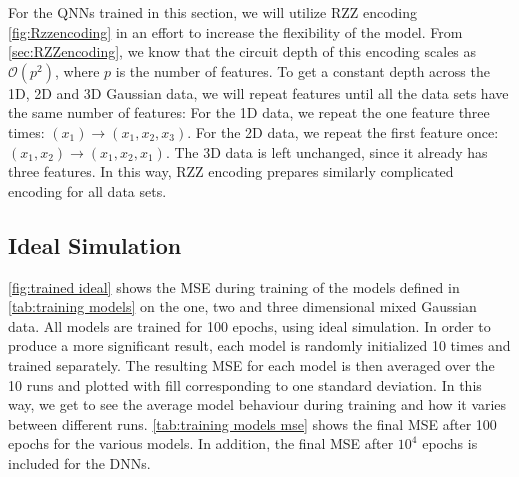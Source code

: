 For the QNNs trained in this section, we will utilize RZZ encoding \autoref{fig:Rzzencoding} in an effort to increase the flexibility of the model. From \autoref{sec:RZZencoding}, we know that the circuit depth of this encoding scales as $\mathcal{O}(p^2)$, where $p$ is the number of features. To get a constant depth across the 1D, 2D and 3D Gaussian data, we will repeat features until all the data sets have the same number of features: For the 1D data, we repeat the one feature three times: $(x_1) \rightarrow (x_1, x_2, x_3)$. For the 2D data, we repeat the first feature once: $(x_1, x_2) \rightarrow (x_1, x_2, x_1)$. The 3D data is left unchanged, since it already has three features. In this way, RZZ encoding prepares similarly complicated encoding for all data sets. 


\subsection{Ideal Simulation}\label{sec:Ideal Simulation}
\autoref{fig:trained ideal} shows the MSE during training of the models defined in \autoref{tab:training models} on the one, two and three dimensional mixed Gaussian data. All models are trained for 100 epochs, using ideal simulation. In order to produce a more significant result, each model is randomly initialized 10 times and trained separately. The resulting MSE for each model is then averaged over the 10 runs and plotted with fill corresponding to one standard deviation. In this way, we get to see the average model behaviour during training and how it varies between different runs. \autoref{tab:training models mse} shows the final MSE after 100 epochs for the various models. In addition, the final MSE after $10^4$ epochs is included for the DNNs.   

